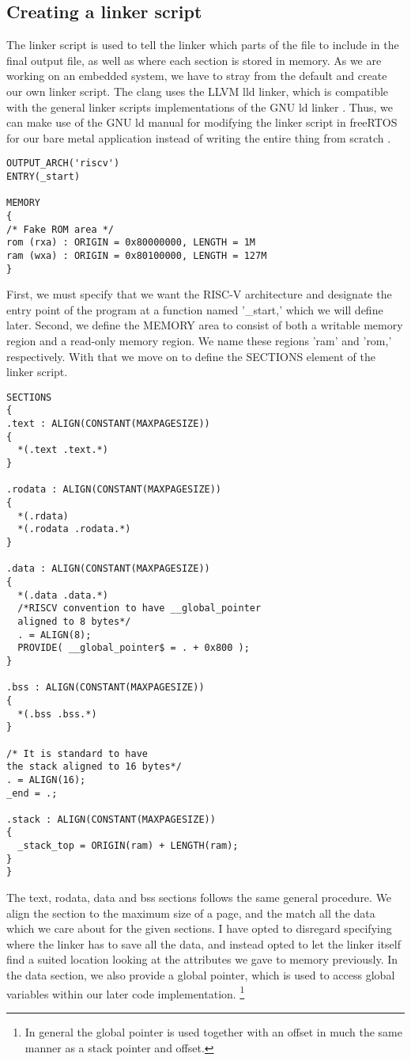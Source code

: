 \subsection{Creating a linker script}
The linker script is used to tell the linker which parts of the file to include
in the final output file, as well as where each section is stored in memory. As
we are working on an embedded system, we have to stray from the default and
create our own linker script. The clang uses the LLVM lld linker, which is compatible
with the general linker scripts implementations of the GNU ld linker \cite{llvm-org-linker}.
Thus, we can make use of the GNU ld manual for modifying the linker script in freeRTOS for our bare metal application instead of writing the entire thing from scratch \cite{GNU-linker}.

\begin{lstlisting}
OUTPUT_ARCH('riscv')
ENTRY(_start)

MEMORY
{
/* Fake ROM area */
rom (rxa) : ORIGIN = 0x80000000, LENGTH = 1M
ram (wxa) : ORIGIN = 0x80100000, LENGTH = 127M
}
\end{lstlisting}
First, we must specify that we want the RISC-V architecture and designate the entry point
of the program at a function named '\_start,' which we will define later.
Second, we define the MEMORY area to consist of both a writable memory region and a read-only
memory region. We name these regions 'ram' and 'rom,' respectively. With that we move on to define the SECTIONS element of the linker script.

\begin{lstlisting}
SECTIONS
{
.text : ALIGN(CONSTANT(MAXPAGESIZE))
{
  *(.text .text.*)
}

.rodata : ALIGN(CONSTANT(MAXPAGESIZE))
{
  *(.rdata)
  *(.rodata .rodata.*)
}

.data : ALIGN(CONSTANT(MAXPAGESIZE))
{
  *(.data .data.*)
  /*RISCV convention to have __global_pointer
  aligned to 8 bytes*/
  . = ALIGN(8);
  PROVIDE( __global_pointer$ = . + 0x800 );
}

.bss : ALIGN(CONSTANT(MAXPAGESIZE))
{
  *(.bss .bss.*)
}

/* It is standard to have
the stack aligned to 16 bytes*/
. = ALIGN(16);
_end = .;

.stack : ALIGN(CONSTANT(MAXPAGESIZE))
{
  _stack_top = ORIGIN(ram) + LENGTH(ram);
}
}
\end{lstlisting}
The text, rodata, data and bss sections follows the same general procedure. We align the
section to the maximum size of a page, and the match all the data which we care about for
the given sections. I have opted to disregard specifying where the linker has to save
all the data, and instead opted to let the linker itself find a suited location looking at
the attributes we gave to memory previously.
In the data section, we also provide a global pointer, which is used to access global variables
within our later code implementation. \footnote{In general the global pointer is used together
with an offset in much the same manner as a stack pointer and offset.}

